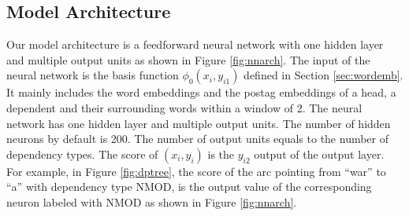 \subsection{Model Architecture}
\label{sec:Neural Network Model Architecture}
Our model architecture is a feedforward neural network with one hidden layer and multiple output units as shown in Figure \ref{fig:nnarch}. The input of the neural network is the basis function $\phi_0(x_i,y_{i1})$ defined in Section \ref{sec:wordemb}. It mainly includes the word embeddings and the postag embeddings of a head, a dependent and their surrounding words within a window of 2. The neural network has one hidden layer and multiple output units. The number of hidden neurons by default is 200. The number of output units equals to the number of dependency types. The score of $(x_i,y_i)$ is the $y_{i2}$ output of the output layer. For example, in Figure \ref{fig:dptree}, the score of the arc pointing from ``war'' to ``a'' with dependency type NMOD, is the output value of the corresponding neuron labeled with NMOD as shown in Figure \ref{fig:nnarch}.

